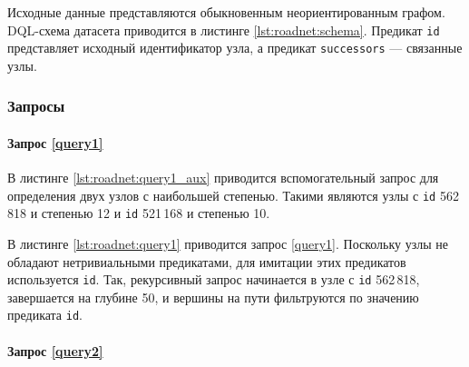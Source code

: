 Исходные данные представляются обыкновенным неориентированным графом. DQL-схема датасета приводится в
листинге \ref{lst:roadnet:schema}. Предикат \texttt{id} представляет исходный идентификатор узла, а предикат
\texttt{successors} --- связанные узлы.

\subsubsection{Запросы}

\paragraph{Запрос \ref{query1}}

В листинге \ref{lst:roadnet:query1_aux} приводится вспомогательный запрос для определения двух узлов с наибольшей
степенью. Такими являются узлы с \texttt{id} 562\,818 и степенью 12 и \texttt{id} 521\,168 и степенью 10.

В листинге \ref{lst:roadnet:query1} приводится запрос \ref{query1}. Поскольку узлы не обладают нетривиальными предикатами,
для имитации этих предикатов используется \texttt{id}. Так, рекурсивный запрос начинается в узле с
\texttt{id} 562\,818, завершается на глубине 50, и вершины на пути фильтруются по значению предиката \texttt{id}.

\paragraph{Запрос \ref{query2}}

